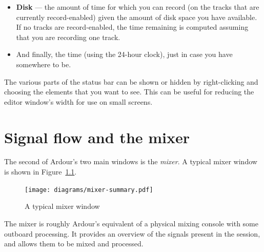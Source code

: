 \documentclass[10pt,a4paper]{book}
\begin{document}
{\begin{itemize}
\begin{ddanger}
Note that DSP load will probably not vary predictably with CPU speed.
Many other things are involved in the timing of the sound-card / JACK
/ Ardour interaction; including the real-time performance of your
system and kernel, the details of your hardware, and in some cases
blind (good or bad) luck.
\end{ddanger}

\item \textbf{Disk} --- the amount of time for which you can record (on the
  tracks that are currently record-enabled) given the amount of disk
  space you have available.  If no tracks are record-enabled, the time
  remaining is computed assuming that you are recording one track.
\item And finally, the time (using the 24-hour clock), just in case
  you have somewhere to be.
\end{itemize}

The various parts of the status bar can be shown or hidden by
right-clicking and choosing the elements that you want to see.  This
can be useful for reducing the editor window's width for use on small
screens.








\chapter{Signal flow and the mixer}


The second of Ardour's two main windows is the \emph{mixer}.  A
typical mixer window is shown in Figure~\ref{fig:mixer-summary}.

\begin{figure}[ht]
\begin{center}
\texttt{[image: diagrams/mixer-summary.pdf]}
\end{center}
\caption{A typical mixer window}
\label{fig:mixer-summary}
\end{figure}

The mixer is roughly Ardour's equivalent of a physical mixing console
with some outboard processing.  It provides an overview of the signals
present in the session, and allows them to be mixed and processed.

}
\end{document}
